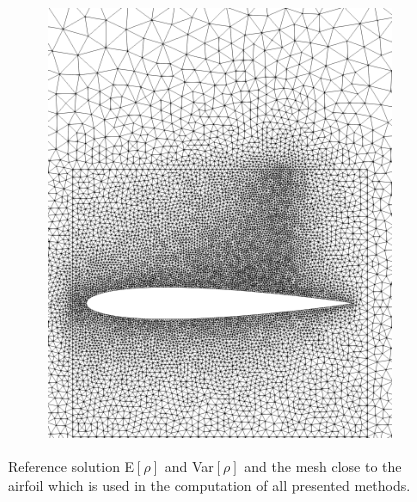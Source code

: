 \begin{figure}[h!]
\begin{subfigure}{0.329\linewidth}
				\includegraphics[width=\linewidth]{figs/Euler1DPlots5/naca_mesh.png}
		\label{fig:referenceSolutionsMesh}
	\end{subfigure}
	\caption{Reference solution E$[\rho]$ and Var$[\rho]$ and the mesh close to the airfoil which is used in the computation of all presented methods.}
	\label{fig:referenceSolution}
\end{figure}

